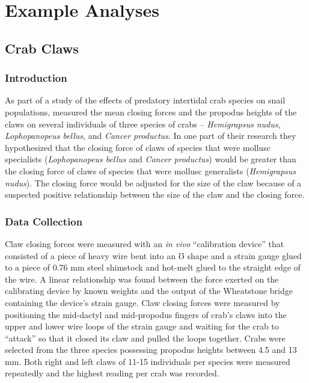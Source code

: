 \documentclass[10pt,openany]{book}\usepackage[]{graphicx}\usepackage[]{color}
\begin{document}

\vspace{-12pt}


\section{Example Analyses}
\subsection{Crab Claws}
\subsubsection*{Introduction}
As part of a study of the effects of predatory intertidal crab species on snail populations, \cite{YamadaBoulding1998} measured the mean closing forces and the propodus heights of the claws on several individuals of three species of crabs -- \emph{Hemigrapsus nudus}, \emph{Lophopanopeus bellus}, and \emph{Cancer productus}.  In one part of their research they hypothesized that the closing force of claws of species that were mollusc specialists (\emph{Lophopanopeus bellus} and \emph{Cancer productus}) would be greater than the closing force of claws of species that were mollusc generalists (\emph{Hemigrapsus nudus}).  The closing force would be adjusted for the size of the claw because of a suspected positive relationship between the size of the claw and the closing force.

\subsubsection*{Data Collection}
Claw closing forces were measured with an \emph{in vivo} ``calibration device'' that consisted of a piece of heavy wire bent into an $\mho$ shape and a strain gauge glued to a piece of 0.76 mm steel shimstock and hot-melt glued to the straight edge of the wire.  A linear relationship was found between the force exerted on the calibrating device by known weights and the output of the Wheatstone bridge containing the device's strain gauge.  Claw closing forces were measured by positioning the mid-dactyl and mid-propodus fingers of crab's claws into the upper and lower wire loops of the strain gauge and waiting for the crab to ``attack'' so that it closed its claw and pulled the loops together.  Crabs were selected from the three species possessing propodus heights between 4.5 and 13 mm.  Both right and left claws of 11-15 individuals per species were measured repeatedly and the highest reading per crab was recorded.
\end{document}
